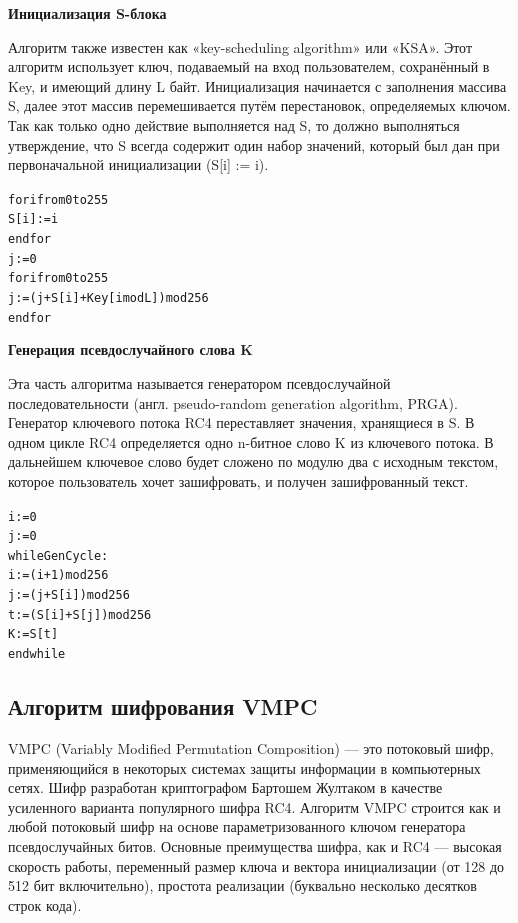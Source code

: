 \documentclass[a4paper]{report}
\begin{document}
\textbf{Инициализация S-блока}

Алгоритм также известен как «key-scheduling algorithm» или «KSA». Этот алгоритм использует ключ, подаваемый на вход пользователем, сохранённый в Key, и имеющий длину L байт. Инициализация начинается с заполнения массива S, далее этот массив перемешивается путём перестановок, определяемых ключом. Так как только одно действие выполняется над S, то должно выполняться утверждение, что S всегда содержит один набор значений, который был дан при первоначальной инициализации (S[i] := i).

\begin{alltt}
		for i from 0 to 255
    		S[i] := i
		endfor
		j := 0
		for i from 0 to 255
    		j := ( j + S[i] + Key[ i mod L ] ) mod 256
		endfor
\end{alltt}




\textbf{Генерация псевдослучайного слова K}

Эта часть алгоритма называется генератором псевдослучайной последовательности (англ. pseudo-random generation algorithm, PRGA). Генератор ключевого потока RC4 переставляет значения, хранящиеся в S. В одном цикле RC4 определяется одно n-битное слово K из ключевого потока. В дальнейшем ключевое слово будет сложено по модулю два с исходным текстом, которое пользователь хочет зашифровать, и получен зашифрованный текст.

\begin{alltt}
		i := 0
		j := 0
		while GenCycle:
    			i := ( i + 1 ) mod 256
    			j := ( j + S[i] ) mod 256
    			t := ( S[i] + S[j] ) mod 256
    			K := S[t] 
		endwhile
\end{alltt}

\newpage
\subsection{Алгоритм шифрования VMPC}
VMPC (Variably Modified Permutation Composition) — это потоковый шифр, применяющийся в некоторых системах защиты информации в компьютерных сетях. Шифр разработан криптографом Бартошем Жултаком в качестве усиленного варианта популярного шифра RC4. Алгоритм VMPC строится как и любой потоковый шифр на основе параметризованного ключом генератора псевдослучайных битов. Основные преимущества шифра, как и RC4 — высокая скорость работы, переменный размер ключа и вектора инициализации (от 128 до 512 бит включительно), простота реализации (буквально несколько десятков строк кода).
\end{document}
